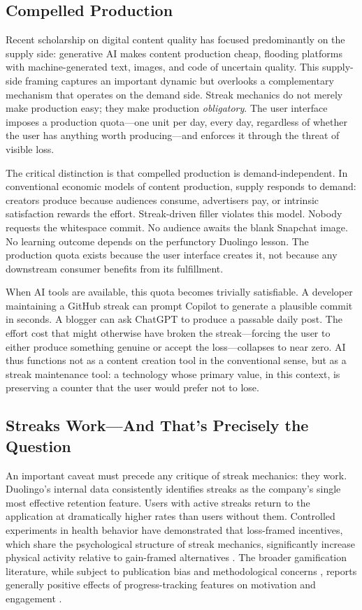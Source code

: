 \documentclass[12pt]{article}
\begin{document}
\subsection{Compelled Production}
\label{sec:compelled-production}

Recent scholarship on digital content quality has focused predominantly on the supply side: generative AI makes content production cheap, flooding platforms with machine-generated text, images, and code of uncertain quality. This supply-side framing captures an important dynamic but overlooks a complementary mechanism that operates on the demand side. Streak mechanics do not merely make production easy; they make production \emph{obligatory}. The user interface imposes a production quota---one unit per day, every day, regardless of whether the user has anything worth producing---and enforces it through the threat of visible loss.

The critical distinction is that compelled production is demand-independent. In conventional economic models of content production, supply responds to demand: creators produce because audiences consume, advertisers pay, or intrinsic satisfaction rewards the effort. Streak-driven filler violates this model. Nobody requests the whitespace commit. No audience awaits the blank Snapchat image. No learning outcome depends on the perfunctory Duolingo lesson. The production quota exists because the user interface creates it, not because any downstream consumer benefits from its fulfillment.

When AI tools are available, this quota becomes trivially satisfiable. A developer maintaining a GitHub streak can prompt Copilot to generate a plausible commit in seconds. A blogger can ask ChatGPT to produce a passable daily post. The effort cost that might otherwise have broken the streak---forcing the user to either produce something genuine or accept the loss---collapses to near zero. AI thus functions not as a content creation tool in the conventional sense, but as a streak maintenance tool: a technology whose primary value, in this context, is preserving a counter that the user would prefer not to lose.

\subsection{Streaks Work---And That's Precisely the Question}
\label{sec:streaks-work}

An important caveat must precede any critique of streak mechanics: they work. Duolingo's internal data consistently identifies streaks as the company's single most effective retention feature. Users with active streaks return to the application at dramatically higher rates than users without them. Controlled experiments in health behavior have demonstrated that loss-framed incentives, which share the psychological structure of streak mechanics, significantly increase physical activity relative to gain-framed alternatives \citep{Patel2016}. The broader gamification literature, while subject to publication bias and methodological concerns \citep{Koivisto2019}, reports generally positive effects of progress-tracking features on motivation and engagement \citep{Hamari2014, Sailer2017}.
\end{document}

